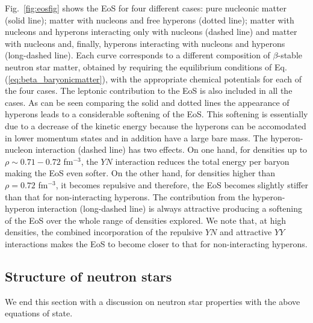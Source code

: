 Fig.\ \ref{fig:eosfig} shows the EoS for four different cases:
pure nucleonic matter (solid line); matter with nucleons and
free hyperons (dotted line); matter with nucleons and hyperons
interacting only with nucleons (dashed line) and matter with nucleons and,
finally,
hyperons interacting with nucleons and hyperons (long-dashed line). Each
curve corresponds to a different composition of $\beta$-stable neutron
star matter, obtained by requiring the equilibrium conditions of
Eq. (\ref{eq:beta_baryonicmatter}), with the appropriate
chemical potentials for each of the four cases. 
The leptonic contribution to the EoS is also included in all the
cases. As can be seen comparing the solid and dotted lines the
appearance of hyperons leads to a considerable softening of the EoS.
This softening is essentially due to a decrease of the kinetic energy
because the hyperons can be accomodated in lower momentum
states and in addition have a large bare mass. The 
hyperon-nucleon interaction (dashed line) has two effects. On
one hand, for densities
up to $\rho \sim 0.71-0.72$ fm$^{-3}$, the $YN$
interaction reduces the total energy per baryon making
the EoS even softer. On the other hand, for 
densities higher than $\rho= 0.72$ fm$^{-3}$, it becomes repulsive and
therefore, the EoS becomes slightly stiffer than that for  
non-interacting hyperons. The contribution from
the hyperon-hyperon interaction (long-dashed line) is always attractive
producing a softening of the EoS over the whole range of densities explored.
We note that, at high densities, the combined
incorporation of the repulsive $YN$ and attractive $YY$ interactions 
makes the
EoS to become closer to that for 
non-interacting hyperons.



\subsection{Structure of neutron stars}
\label{sec:sec3b}

We end this section with a discussion on neutron star properties 
with the above equations of state.

